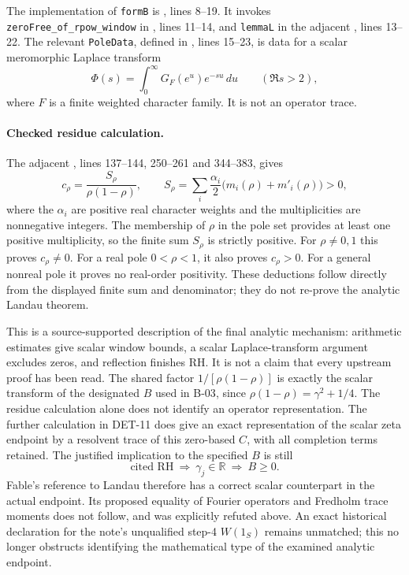 \documentclass[11pt,a4paper]{article}
\newcommand{\R}{\mathbb R}
\newcommand{\fid}[1]{\textsf{#1}}
\begin{document}
The implementation of \texttt{formB} is , lines 8--19. It invokes \texttt{zeroFree\_of\_rpow\_window} in , lines 11--14, and \texttt{lemmaL} in the adjacent , lines 13--22. The relevant \texttt{PoleData}, defined in , lines 15--23, is data for a scalar meromorphic Laplace transform
\[
 \Phi(s)=\int_0^\infty G_F(e^u)e^{-su}\,du\qquad(\Re s>2),
\]
where $F$ is a finite weighted character family. It is not an operator trace.

\paragraph{Checked residue calculation.}
The adjacent , lines 137--144, 250--261 and 344--383, gives
\[
 c_\rho=\frac{S_\rho}{\rho(1-\rho)},\qquad
 S_\rho=\sum_i\frac{\alpha_i}{2}\bigl(m_i(\rho)+m'_i(\rho)\bigr)>0,
\]
where the $\alpha_i$ are positive real character weights and the multiplicities are nonnegative integers. The membership of $\rho$ in the pole set provides at least one positive multiplicity, so the finite sum $S_\rho$ is strictly positive. For $\rho\ne0,1$ this proves $c_\rho\ne0$. For a real pole $0<\rho<1$, it also proves $c_\rho>0$. For a general nonreal pole it proves no real-order positivity. These deductions follow directly from the displayed finite sum and denominator; they do not re-prove the analytic Landau theorem.

This is a source-supported description of the final analytic mechanism: arithmetic estimates give scalar window bounds, a scalar Laplace-transform argument excludes zeros, and reflection finishes RH. It is not a claim that every upstream proof has been read. The shared factor $1/[\rho(1-\rho)]$ is exactly the scalar transform of the designated $B$ used in \fid{B-03}, since $\rho(1-\rho)=\gamma^2+1/4$. The residue calculation alone does not identify an operator representation. The further calculation in \fid{DET-11} does give an exact representation of the scalar zeta endpoint by a resolvent trace of this zero-based $C$, with all completion terms retained. The justified implication to the specified $B$ is still
\[
 \text{cited RH}\ \Longrightarrow\ \gamma_j\in\R\ \Longrightarrow\ B\ge0.
\]
Fable's reference to Landau therefore has a correct scalar counterpart in the actual endpoint. Its proposed equality of Fourier operators and Fredholm trace moments does not follow, and was explicitly refuted above. An exact historical declaration for the note's unqualified step-4 $W(1_S)$ remains unmatched; this no longer obstructs identifying the mathematical type of the examined analytic endpoint.
\end{document}
